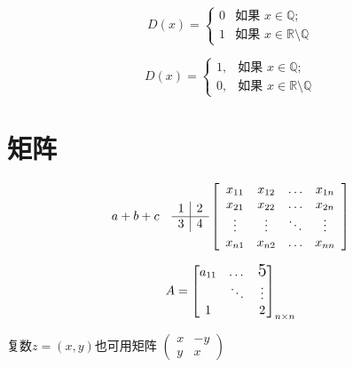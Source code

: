 \documentclass{article}
\begin{document}
    $$
    D(x) = \left\{
    \begin{array}{ll}
    {0} & \text{如果 } x \in \mathbb{Q}; \\ 
    {1} & \text{如果 } x \in \mathbb{R} \setminus \mathbb{Q}
    \end{array}\right.
    $$

    \begin{equation}
    D(x) = \begin{cases}
    1, & \text{如果 } x \in \mathbb{Q}; \\
    0, & \text{如果 } x \in \mathbb{R} \setminus \mathbb{Q}
    \end{cases}
    \end{equation}


\section{矩阵}
    \[
    a + b \\ + c\quad %
    \begin{array}{l | l}
    {1} & {2} \\ 
    \hline
    {3} & {4}
    \end{array} 
    \left[\begin{array}{cccc}
    {x_{11}} & {x_{12}} & {\dots} & {x_{1 n}} \\ 
    {x_{21}} & {x_{22}} & {\dots} & {x_{2 n}} \\ 
    {\vdots} & {\vdots} & {\ddots} & {\vdots} \\ 
    {x_{n 1}} & {x_{n 2}} & {\dots} & {x_{n n}}
    \end{array}\right]
    \]

    \[
    A = \begin{bmatrix}
        a_{11} & \dots & \text{\Large5}\\ %
        & \ddots  & \vdots \\ %
        1 &  & 2    
    \end{bmatrix}_{n \times n} %
    \]

    复数$z = (x, y)$也可用矩阵 
    \begin{math}
    \left(\begin{smallmatrix}
    x & -y \\
    y & x   
    \end{smallmatrix}\right) %
    \end{math}
\end{document}

